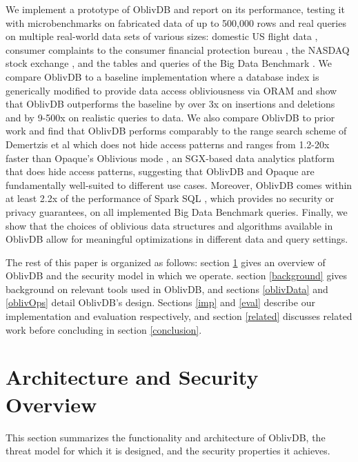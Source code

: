 \documentclass[conference]{IEEEtran}
\def\name/{OblivDB}
\begin{document}
We implement a prototype of \name/ and report on its performance, testing it with microbenchmarks on fabricated data of up to 500,000 rows and real queries on multiple real-world data sets of various sizes: domestic US flight data \cite{FLIGHT}, consumer complaints to the consumer financial protection bureau \cite{CFPB}, the NASDAQ stock exchange \cite{NASDAQ}, and the tables and queries of the Big Data Benchmark \cite{BDB}. We compare \name/ to a baseline implementation where a database index is generically modified to provide data access obliviousness via ORAM and show that \name/ outperforms the baseline by over 3x on insertions and deletions and by 9-500x on realistic queries to data. We also compare \name/ to prior work and find that \name/ performs comparably to the range search scheme of Demertzis et al \cite{DPP+16} which does not hide access patterns and ranges from 1.2-20x faster than Opaque's Oblivious mode \cite{ZDB+17}, an SGX-based data analytics platform that does hide access patterns, suggesting that \name/ and Opaque are fundamentally well-suited to different use cases. Moreover, \name/ comes within at least 2.2x of the performance of Spark SQL \cite{SparkSQL}, which provides no security or privacy guarantees, on all implemented Big Data Benchmark queries. Finally, we show that the choices of oblivious data structures and algorithms available in \name/ allow for meaningful optimizations in different data and query settings. 

The rest of this paper is organized as follows: section \ref{model} gives an overview of \name/ and the security model in which we operate. section \ref{background} gives background on relevant tools used in \name/, and sections \ref{oblivData} and \ref{oblivOps} detail \name/'s design. Sections \ref{imp} and \ref{eval} describe our implementation and evaluation respectively, and section \ref{related} discusses related work before concluding in section \ref{conclusion}. 

\section{Architecture and Security Overview}\label{model}
This section summarizes the functionality and architecture of \name/, the threat model for which it is designed, and the security properties it achieves. 
\end{document}
